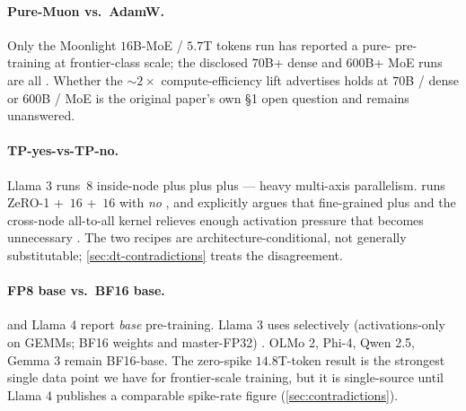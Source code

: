 \paragraph{Pure-Muon vs.\ AdamW.}
Only the Moonlight $16$B-MoE / $5.7$T tokens run \citep{muon-moonlight2025}
has reported a pure- pre-training at frontier-class scale; the
disclosed $70$B+ dense and $600$B+ MoE runs are all . Whether
the $\sim 2\times$ compute-efficiency lift  advertises holds at
$70$B / dense or $600$B / MoE is the original paper's own §1 open
question and remains unanswered.

\paragraph{TP-yes-vs-TP-no.}
Llama 3 \citep{meta-llama3} runs $\,8$ inside-node plus  plus  plus
 --- heavy multi-axis parallelism.  \citep{deepseek-v3}
runs ZeRO-1 + $\,16$ + $\,16$  with \emph{no} , and
explicitly argues that fine-grained  plus  and the
cross-node all-to-all kernel relieves enough activation pressure that
 becomes unnecessary \citep[\S 3.2.2]{deepseek-v3}. The two
recipes are architecture-conditional, not generally substitutable;
\cref{sec:dt-contradictions} treats the disagreement.

\paragraph{FP8 base vs.\ BF16 base.}
 \citep[\S 3.3]{deepseek-v3} and Llama 4
\citep{meta-llama4} report  \emph{base} pre-training. Llama 3 uses
 selectively (activations-only on  GEMMs; BF16 weights and
master-FP32) \citep{meta-llama3}. OLMo 2, Phi-4, Qwen 2.5, Gemma 3
remain BF16-base. The  zero-spike $14.8$T-token result
\citep[abstract]{deepseek-v3} is the strongest single data point we
have for frontier-scale  training, but it is single-source until
Llama 4 publishes a comparable spike-rate figure
(\cref{sec:contradictions}).

